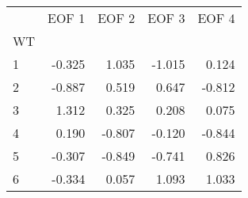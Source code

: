 \begin{tabular}{lrrrr}
\toprule
{} &  EOF 1 &  EOF 2 &  EOF 3 &  EOF 4 \\
WT &        &        &        &        \\
\midrule
1  & -0.325 &  1.035 & -1.015 &  0.124 \\
2  & -0.887 &  0.519 &  0.647 & -0.812 \\
3  &  1.312 &  0.325 &  0.208 &  0.075 \\
4  &  0.190 & -0.807 & -0.120 & -0.844 \\
5  & -0.307 & -0.849 & -0.741 &  0.826 \\
6  & -0.334 &  0.057 &  1.093 &  1.033 \\
\bottomrule
\end{tabular}
